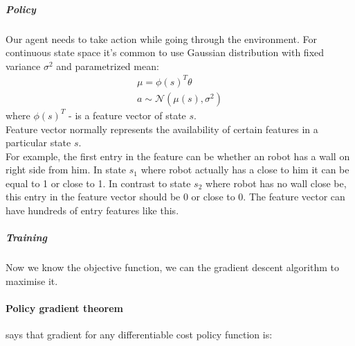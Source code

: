 \subparagraph{Policy} Our agent needs to take action while going through
the environment.
For continuous state space it's common to
use Gaussian distribution with fixed variance $\sigma^2$ and parametrized mean:
\begin{align} \label{eq:param_mean}
	\mu = \phi(s)^{T} \theta \\
	a \sim \mathcal{N}(\mu(s), \sigma^2)
\end{align}
where $\phi(s)^{T}$ - is a feature vector of state $s$. \\
Feature vector normally represents the availability of certain features in
a particular state $s$. \\
For example, the first entry in the feature can be
whether an robot has a wall on right side from him. In state $s_1$
where robot actually has a close to him
it can be equal to 1 or close to 1. In contrast to state $s_2$ where
robot has no wall close be, this entry in the feature vector
should be 0 or close to 0.
The feature vector can have hundreds of entry features like this.

\subparagraph{Training} Now we know the objective function, we can the gradient descent
algorithm to maximise it.



%







\paragraph{Policy gradient theorem} says that gradient
for any differentiable cost policy function is:

